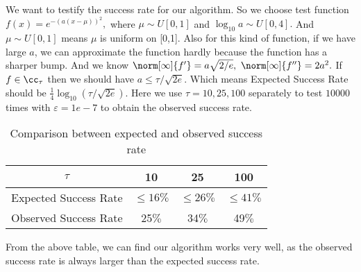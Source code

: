 We want to testify the success rate for our algorithm. So we
choose test function $f(x)=e^{-(a(x-\mu))^2},$
where $\mu \sim U[0,1]$ and $\log_{10} a \sim U[0,4].$
And $\mu \sim U[0,1]$ means $\mu$ is uniform on [0,1].
Also for this kind of function, if we have large $a$, we can approximate the function hardly
because the function has a sharper bump. And we know
$\norm[\infty]{f'}=a\sqrt{2/e}, \ \norm[\infty]{f''}=2a^2.$
If $f \in \cc_{\tau}$ then we should have
$a \leq \tau/\sqrt{2e}.$ Which means Expected Success Rate should be $\frac{1}{4}\log_{10}(\tau/\sqrt{2e}).$
Here we use $\tau = 10, 25 , 100$ separately to test $10000$ times with
$\varepsilon = 1e-7$ to obtain the observed success rate.
\begin{table}[h]
\centering
\begin{tabular}{cccc}
$\tau$ &  10 & 25 & 100\\
\toprule
Expected Success Rate &  $\leq 16 \%$ &  $\leq 26 \%$  & $\leq 41 \%$ \\
Observed Success Rate & 25$\%$ &  34$\%$  & 49$\%$ \\
\end{tabular}
\caption{ Comparison between expected and observed success rate}
\end{table}

From the above table, we can find our algorithm works very well, as the observed
success rate is always larger than the expected success rate.\\




